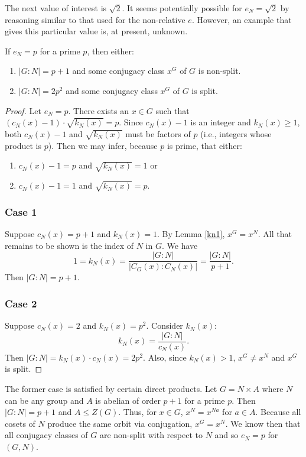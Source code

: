 \documentclass[main.tex]{subfiles}
\begin{document}
The next value of interest is $\sqrt{2}$. It seems potentially possible for $e_N = \sqrt{2}$ by reasoning similar to that used for the non-relative $e$. However, an example that gives this particular value is, at present, unknown.

\begin{theorem}
If $e_N = p$ for a prime $p$, then either:
\begin{enumerate}
	\item $|G:N| = p + 1$ and some conjugacy class $x^G$ of $G$ is non-split.
	\item $|G:N| = 2p^2$ and some conjugacy class $x^G$ of $G$ is split.
\end{enumerate}
\end{theorem}

\begin{proof}
Let $e_N = p$. There exists an $x \in G$ such that $(c_N(x) - 1) \cdot \sqrt{k_N(x)} = p$. Since $c_N(x) - 1$ is an integer and $k_N(x) \ge 1$, both $c_N(x) - 1$ and $\sqrt{k_N(x)}$ must be factors of $p$ (i.e., integers whose product is $p$). Then we may infer, because $p$ is prime, that either:
\begin{enumerate}
	\item $c_N(x) - 1 = p$ and $\sqrt{k_N(x)} = 1$ or
	\item $c_N(x) - 1 = 1$ and $\sqrt{k_N(x)} = p$.
\end{enumerate}

\subsubsection*{Case 1} Suppose $c_N(x) = p + 1$ and $k_N(x) = 1$. By Lemma \ref{kn1}, $x^G = x^N$. All that remains to be shown is the index of $N$ in $G$. We have
$$1 = k_N(x) = \frac{|G : N|}{|C_G(x):C_N(x)|} = \frac{|G : N|}{p + 1}\text{.}$$
Then $|G:N| = p+1$.

\subsubsection*{Case 2} Suppose $c_N(x) = 2$ and $k_N(x) = p^2$. Consider $k_N(x)$:
$$k_N(x) = \frac{|G:N|}{c_N(x)}\text{.}$$
Then $|G:N| = k_N(x) \cdot c_N(x) = 2p^2$. Also, since $k_N(x) > 1$, $x^G \ne x^N$ and $x^G$ is split.
\end{proof}

The former case is satisfied by certain direct products. Let $G = N \times A$ where $N$ can be any group and $A$ is abelian of order $p+1$ for a prime $p$. Then $|G : N| = p + 1$ and $A \le Z(G)$. Thus, for $x \in G$, $x^N = x^{Na}$ for $a \in A$. Because all cosets of $N$ produce the same orbit via conjugation, $x^G = x^N$. We know then that all conjugacy classes of $G$ are non-split with respect to $N$ and so $e_N = p$ for $(G, N)$.
\end{document}
